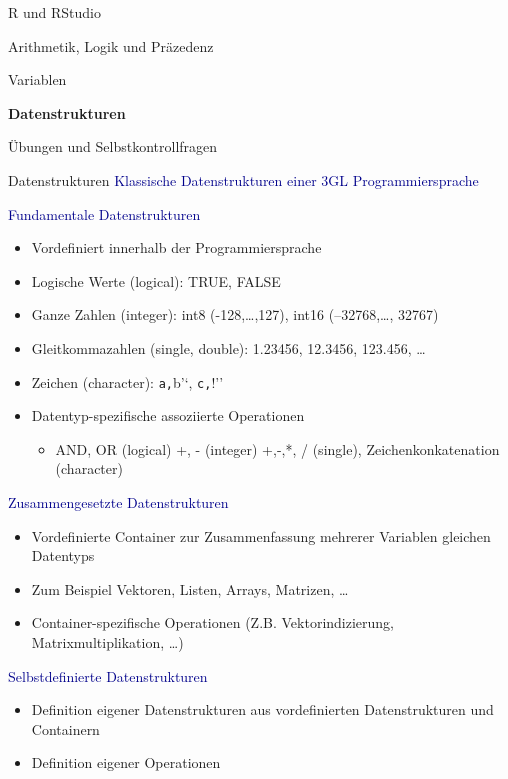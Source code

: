 \documentclass[
  8pt,
  ignorenonframetext,
]{beamer}
\providecommand{\tightlist}{%
  \setlength{\itemsep}{0pt}\setlength{\parskip}{0pt}}
\begin{document}
\begin{frame}{}
\protect\hypertarget{section-6}{}
\large
\vfill
{}

R und RStudio

Arithmetik, Logik und Präzedenz

Variablen

\textbf{Datenstrukturen}

Übungen und Selbstkontrollfragen
\end{frame}

\begin{frame}[fragile]{Datenstrukturen}
\protect\hypertarget{datenstrukturen}{}
\textcolor{darkblue}{Klassische Datenstrukturen einer 3GL Programmiersprache}

\small

\textcolor{darkblue}{Fundamentale Datenstrukturen}

\begin{itemize}
\tightlist
\item
  Vordefiniert innerhalb der Programmiersprache
\item
  Logische Werte (logical): TRUE, FALSE
\item
  Ganze Zahlen (integer): int8 (-128,\ldots,127), int16 (--32768,\ldots,
  32767)
\item
  Gleitkommazahlen (single, double): 1.23456, 12.3456, 123.456, \ldots{}
\item
  Zeichen (character):
  \texttt{a\textquotesingle{}\textquotesingle{},}b'`,
  \texttt{c\textquotesingle{}\textquotesingle{},}!''
\item
  Datentyp-spezifische assoziierte Operationen

  \begin{itemize}
  \tightlist
  \item
    \small AND, OR (logical) +, - (integer) +,-,*, / (single),
    Zeichenkonkatenation (character)
  \end{itemize}
\end{itemize}

\textcolor{darkblue}{Zusammengesetzte Datenstrukturen}

\begin{itemize}
\tightlist
\item
  Vordefinierte Container zur Zusammenfassung mehrerer Variablen
  gleichen Datentyps
\item
  Zum Beispiel Vektoren, Listen, Arrays, Matrizen, \ldots{}
\item
  Container-spezifische Operationen (Z.B. Vektorindizierung,
  Matrixmultiplikation, \ldots)
\end{itemize}

\textcolor{darkblue}{Selbstdefinierte Datenstrukturen}

\begin{itemize}
\tightlist
\item
  Definition eigener Datenstrukturen aus vordefinierten Datenstrukturen
  und Containern
\item
  Definition eigener Operationen
\end{itemize}
\end{frame}
\end{document}

